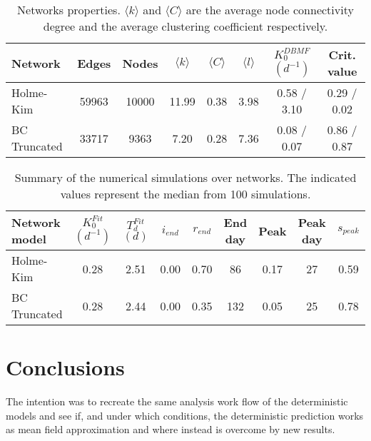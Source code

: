 \documentclass[DIV=12, BCOR=0pt]{scrartcl}  %
\begin{document}
	\begin{table}[h!]
		\centering
		\caption{Networks properties. $\langle k \rangle$ and $\langle C \rangle$ are the average node connectivity degree and the average clustering coefficient respectively. }
		\label{tab:lock_networks}
		\begin{tabular}{lccccccc}
			\toprule
			Network &  Edges &  Nodes & $\langle k \rangle$ & $\langle C \rangle$ & $\langle l \rangle$ & $K_0^{DBMF}$ $(d^{-1})$ & Crit. value \\
			\midrule
			Holme-Kim 		&  59963 &  10000 & 11.99 &  0.38 &  3.98 &  0.58 / 3.10 &   0.29 / 0.02 \\
			BC Truncated 	&  33717 &   9363 &  7.20 &  0.28 &  7.36 &  0.08 / 0.07 &   0.86 / 0.87 \\
			
			\bottomrule
		\end{tabular}
	\end{table}


	\begin{table}[h!]
		\centering
		\caption{Summary of the numerical simulations over networks. The indicated values represent the median from 100 simulations.}
		\label{tab:lock_results}
		\begin{tabular}{lcccccccc}
			\toprule
			Network model & $K_0^{Fit}$ $(d^{-1})$ & $T_d^{Fit}$ $(d)$ & $i_{end}$ & $r_{end}$ & End day & Peak  & Peak day & $s_{peak}$\\
			\midrule
		 	Holme-Kim 		&    0.28 &   2.51 &  0.00 &  0.70 &  	 86 &  0.17 &   27 &	0.59 \\
			BC Truncated	&    0.28 &   2.44 &  0.00 &  0.35 & 		132 &  0.05 &   25 &	0.78 \\
			
			\bottomrule
		\end{tabular}
	\end{table}
	
	
	
	\section{Conclusions}
	The intention was to recreate the same analysis work flow of the deterministic models and see if, and under which conditions, the deterministic prediction works as mean field approximation and where instead is overcome by new results. 
\end{document}
